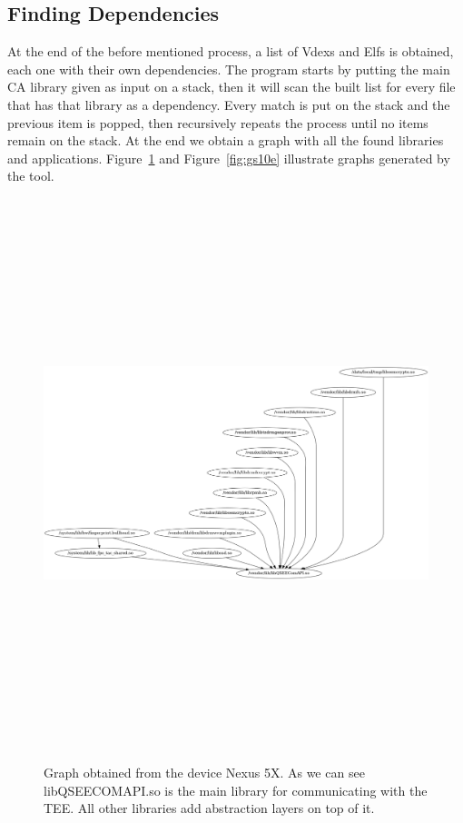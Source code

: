 \documentclass[a4paper,11pt,oneside]{article}
\begin{document}
\subsection{Finding Dependencies}
At the end of the before mentioned process, a list of Vdexs and Elfs is obtained, each one with
their own dependencies. The program starts by putting the main CA library given
as input on a stack, then it will scan the built list for every file that has
that library as a dependency. Every match is put on the stack and the previous
item is popped, then recursively repeats the
process until no items remain on the stack. At the end we obtain
a graph with all the found libraries and applications.  Figure~\ref{fig:nexus5x} and Figure~\ref{fig:gs10e} illustrate graphs generated by the tool.
\begin{figure}[!htb]
  \includegraphics[width=16cm, height=16cm]{figures/nexus5x.png}
  \label{fig:nexus5x}
  \caption{Graph obtained from the device Nexus 5X. As we can see libQSEECOMAPI.so is the main library for communicating with the TEE. All other libraries add abstraction layers on top of it.}
\end{figure}
\end{document}
